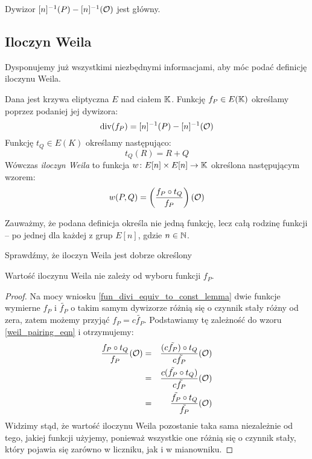 \begin{corollary}
Dywizor $[n]^{-1}(P) - [n]^{-1}(\mathcal{O})$ jest główny.
\end{corollary}

\subsection*{Iloczyn Weila}

Dysponujemy już wszystkimi niezbędnymi informacjami,
aby móc podać definicję iloczynu Weila.

\begin{definition}\label{weil_pairing_def}
Dana jest krzywa eliptyczna $E$ nad ciałem $\mathbb{K}$.
Funkcję $f_P \in E(\mathbb{K})$ określamy poprzez podaniej jej dywizora:
\begin{equation}
\operatorname{div}(f_P) = [n]^{-1}(P) - [n]^{-1}(\mathcal{O})
\end{equation}
Funkcję $t_Q \in E(K)$ określamy następująco:
\begin{equation}
t_Q(R) = R + Q
\end{equation}
Wówczas \emph{iloczyn Weila} to funkcja
$w\colon E[n] \times E[n] \to \mathbb{K}$
określona następującym wzorem:
\begin{equation}\label{weil_pairing_eqn}
w(P, Q) = \left(\frac{f_P \circ t_Q}{f_P}\right)(\mathcal{O})
\end{equation}
\end{definition}

\begin{remark}
Zauważmy, że podana definicja określa nie jedną funkcję,
lecz całą rodzinę funkcji --
po jednej dla każdej z grup $E[n]$, gdzie $n \in \mathbb{N}$.
\end{remark}

Sprawdźmy, że iloczyn Weila jest dobrze określony

\begin{lemma}\label{weil_pairing_ignore_const_lemma}
Wartość iloczynu Weila nie zależy od wyboru funkcji $f_P$.
\end{lemma}

\begin{proof}
Na mocy wniosku \ref{fun_divi_equiv_to_const_lemma}
dwie funkcje wymierne $f_P$ i $\tilde{f_P}$ o takim samym dywizorze
różnią się o czynnik stały różny od zera,
zatem możemy przyjąć $f_P = c\tilde{f_P}$.
Podstawiamy tę zależność do wzoru \ref{weil_pairing_eqn} i otrzymujemy:
\begin{eqnarray*}
\frac{f_P \circ t_Q}{f_P}(\mathcal{O})
& = & \frac{(c\tilde{f_P}) \circ t_Q}{c\tilde{f_P}}(\mathcal{O}) \\
& = & \frac{c(\tilde{f_P} \circ t_Q)}{c\tilde{f_P}}(\mathcal{O}) \\
& = & \frac{\tilde{f_P} \circ t_Q}{\tilde{f_P}}(\mathcal{O})
\end{eqnarray*}
Widzimy stąd, że wartość iloczynu Weila pozostanie taka sama
niezależnie od tego, jakiej funkcji użyjemy,
ponieważ wszystkie one różnią się o czynnik stały,
który pojawia się zarówno w liczniku, jak i w mianowniku.
\end{proof}

